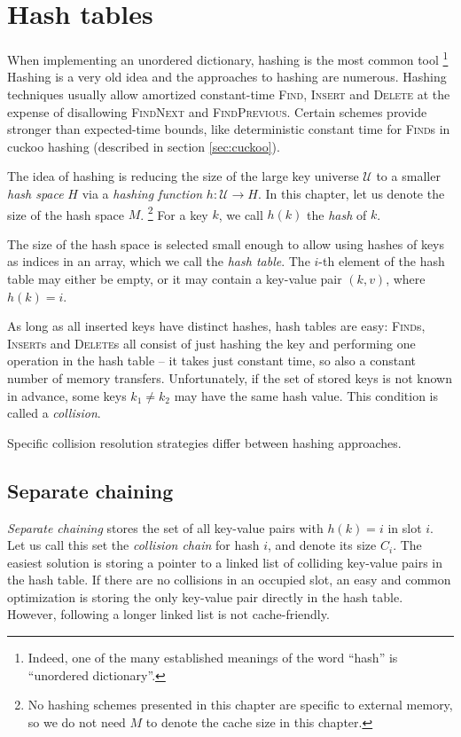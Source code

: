 \chapter{Hash tables}
\label{chapter:hashing}
When implementing an unordered dictionary, hashing is the most common tool
\footnote{Indeed, one of the many established meanings of the word ``hash''
	is ``unordered dictionary''.}
Hashing is a very old idea and the approaches to hashing are numerous. Hashing
techniques usually allow amortized constant-time \textsc{Find}, \textsc{Insert}
and \textsc{Delete} at the expense of disallowing \textsc{FindNext} and
\textsc{FindPrevious}. Certain schemes provide stronger than expected-time
bounds, like deterministic constant time for \textsc{Find}s in cuckoo hashing
(described in section \ref{sec:cuckoo}).

The idea of hashing is reducing the size of the large key universe
$\mathcal{U}$ to a smaller \emph{hash space} $H$ via a \emph{hashing function}
$h\mathop{:}\mathcal{U}\rightarrow H$.
In this chapter, let us denote the size of the hash space $M$.
\footnote{%
	No hashing schemes presented in this chapter are specific to external
	memory, so we do not need $M$ to denote the cache size in this chapter.
}
For a key $k$, we call $h(k)$ the \emph{hash} of $k$.

The size of the hash space is selected small enough to allow using hashes
of keys as indices in an array, which we call the \emph{hash table}.
The $i$-th element of the hash table may either be empty, or it may contain
a key-value pair $(k,v)$, where $h(k)=i$.


As long as all inserted keys have distinct hashes, hash tables are easy:
\textsc{Find}s, \textsc{Insert}s and \textsc{Delete}s all consist of just
hashing the key and performing one operation in the hash table -- it takes just
constant time, so also a constant number of memory transfers.
Unfortunately, if the set of stored keys is not known in advance,
some keys $k_1\neq k_2$ may have the same hash value.
This condition is called a \emph{collision}.

Specific collision resolution strategies differ between hashing approaches.

\section{Separate chaining}
\emph{Separate chaining} stores the set of all key-value pairs with
$h(k)=i$ in slot $i$. Let us call this set the \emph{collision chain} for hash
$i$, and denote its size $C_i$. The easiest solution is storing a pointer to
a linked list of colliding key-value pairs in the hash table. If there are no
collisions in an occupied slot, an easy and common optimization is storing
the only key-value pair directly in the hash table. However, following a longer
linked list is not cache-friendly.


